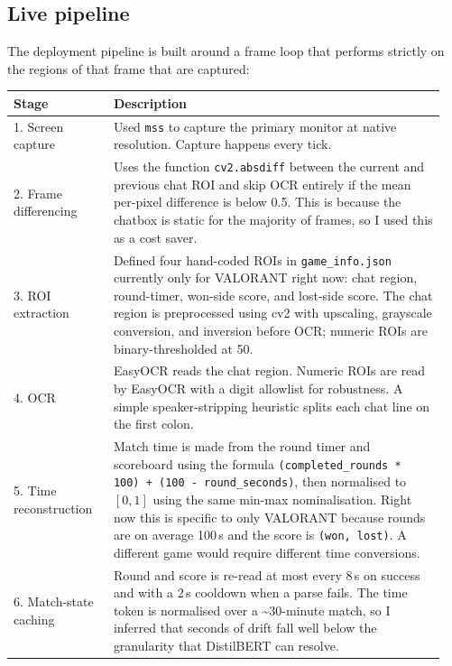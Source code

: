 \documentclass[a4paper,10.5pt,twoside]{article}
\begin{document}
\subsection{Live pipeline}

The deployment pipeline is built around a frame loop that performs strictly on the regions of that frame that are captured:

\begin{table}[H]
    \centering
    \small
    \begin{tabular}{@{}p{0.22\linewidth}p{0.73\linewidth}@{}}
    \toprule
    \textbf{Stage} & \textbf{Description} \\
    \midrule
    1. Screen capture        & Used \texttt{mss} to capture the primary monitor at native resolution. Capture happens every tick. \\
    2. Frame differencing    & Uses the function \texttt{cv2.absdiff} between the current and previous chat ROI and skip OCR entirely if the mean per-pixel difference is below 0.5. This is because the chatbox is static for the majority of frames, so I used this as a cost saver. \\
    3. ROI extraction        & Defined four hand-coded ROIs in \texttt{game\_info.json} currently only for VALORANT right now: chat region, round-timer, won-side score, and lost-side score. The chat region is preprocessed using cv2 with upscaling, grayscale conversion, and inversion before OCR; numeric ROIs are binary-thresholded at 50. \\
    4. OCR                   & EasyOCR reads the chat region. Numeric ROIs are read by EasyOCR with a digit allowlist for robustness. A simple speaker-stripping heuristic splits each chat line on the first colon. \\
    5. Time reconstruction   & Match time is made from the round timer and scoreboard using the formula \texttt{(completed\_rounds * 100) + (100 - round\_seconds)}, then normalised to $[0, 1]$ using the same min-max nominalisation. Right now this is specific to only VALORANT because rounds are on average 100\,s and the score is \texttt{(won, lost)}. A different game would require different time conversions. \\
    6. Match-state caching   & Round and score is re-read at most every 8\,s on success and with a 2\,s cooldown when a parse fails. The time token is normalised over a \textasciitilde{}30-minute match, so I inferred that seconds of drift fall well below the granularity that DistilBERT can resolve. \\

\end{tabular}
\end{table}
\end{document}
